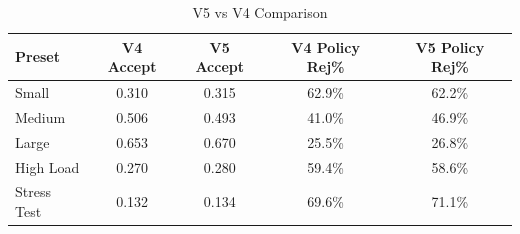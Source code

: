 \begin{table}[h]
\centering
\caption{V5 vs V4 Comparison}
\label{tab:comparison}
\begin{tabular}{lcccc}
\toprule
Preset & V4 Accept & V5 Accept & V4 Policy Rej\% & V5 Policy Rej\% \\
\midrule
Small & 0.310 & 0.315 & 62.9\% & 62.2\% \\
Medium & 0.506 & 0.493 & 41.0\% & 46.9\% \\
Large & 0.653 & 0.670 & 25.5\% & 26.8\% \\
High Load & 0.270 & 0.280 & 59.4\% & 58.6\% \\
Stress Test & 0.132 & 0.134 & 69.6\% & 71.1\% \\
\bottomrule
\end{tabular}
\end{table}
